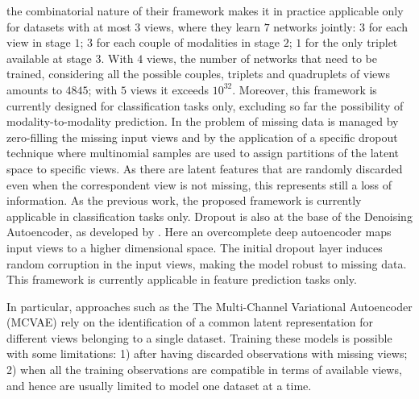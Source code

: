 the combinatorial nature of their framework makes it in practice applicable only for datasets with at most $3$ views, where they learn $7$ networks jointly:
$3$ for each view in stage $1$;
$3$ for each couple of modalities in stage $2$;
$1$ for the only triplet available at stage $3$.
With $4$ views, the number of networks that need to be trained, considering all the possible couples, triplets and quadruplets of views amounts to $4845$;
with $5$ views it exceeds $10^{32}$. 
Moreover, this framework is currently designed for classification tasks only, excluding so far the possibility of modality-to-modality prediction.
In \cite{embracenet} the problem of missing data is managed by zero-filling the missing input views and by the application of a specific dropout technique where multinomial samples are used to assign partitions of the latent space to specific views.
As there are latent features that are randomly discarded even when the correspondent view is not missing, this represents still a loss of information.
As the previous work, the proposed framework is currently applicable in classification tasks only.
Dropout is also at the base of the Denoising Autoencoder, as developed by \cite{dae}.
Here an overcomplete deep autoencoder maps input views to a higher dimensional space.
The initial dropout layer induces random corruption in the input views, making the model robust to missing data.
This framework is currently applicable in feature prediction tasks only.

In particular, approaches such as the The Multi-Channel Variational Autoencoder (MCVAE) \citep{Antelmi2019} rely on the identification of a common latent representation for different views belonging to a single dataset.
Training these models is possible with some limitations:
1) after having discarded observations with missing views;
2) when all the training observations are compatible in terms of available views, and hence are usually limited to model one dataset at a time.

